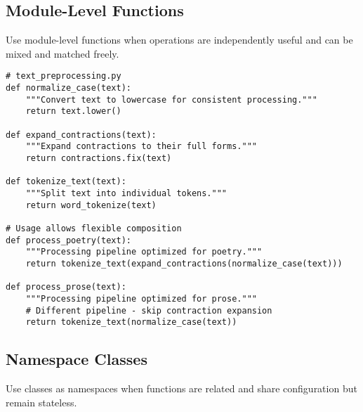\documentclass[11pt,a4paper]{article}
\begin{document}
\subsection{Module-Level Functions}

Use module-level functions when operations are independently useful and can be mixed and matched freely.

\begin{lstlisting}[caption=Module-level organization for flexibility]
# text_preprocessing.py
def normalize_case(text):
    """Convert text to lowercase for consistent processing."""
    return text.lower()

def expand_contractions(text):
    """Expand contractions to their full forms."""
    return contractions.fix(text)

def tokenize_text(text):
    """Split text into individual tokens."""
    return word_tokenize(text)

# Usage allows flexible composition
def process_poetry(text):
    """Processing pipeline optimized for poetry."""
    return tokenize_text(expand_contractions(normalize_case(text)))

def process_prose(text):
    """Processing pipeline optimized for prose."""
    # Different pipeline - skip contraction expansion
    return tokenize_text(normalize_case(text))
\end{lstlisting}

\subsection{Namespace Classes}

Use classes as namespaces when functions are related and share configuration but remain stateless.
\end{document}
